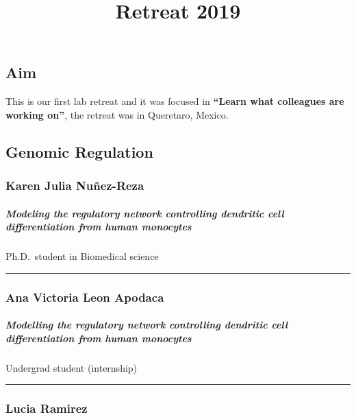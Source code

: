 \documentclass[]{article}
\title{Retreat 2019}
\author{}
\date{}
\let\oldsubparagraph\subparagraph
\renewcommand{\subparagraph}[1]{\oldsubparagraph{#1}\mbox{}}
\begin{document}
\maketitle

{
\setcounter{tocdepth}{3}
\tableofcontents
}
\subsection{Aim}\label{aim}

This is our first lab retreat and it was focused in \textbf{``Learn what
colleagues are working on''}, the retreat was in Queretaro, Mexico.\\

\subsection{Genomic Regulation}\label{genomic-regulation}

\subsubsection{Karen Julia Nuñez-Reza}\label{karen-julia-nunez-reza}

\subparagraph{ Modeling the regulatory network controlling dendritic
cell differentiation from human
monocytes}\label{modeling-the-regulatory-network-controlling-dendritic-cell-differentiation-from-human-monocytes}

Ph.D.~student in Biomedical science

\begin{center}\rule{0.5\linewidth}{\linethickness}\end{center}

\subsubsection{Ana Victoria Leon
Apodaca}\label{ana-victoria-leon-apodaca}

\subparagraph{ Modelling the regulatory network controlling dendritic
cell differentiation from human
monocytes}\label{modelling-the-regulatory-network-controlling-dendritic-cell-differentiation-from-human-monocytes}

Undergrad student (internship)

\begin{center}\rule{0.5\linewidth}{\linethickness}\end{center}

\subsubsection{Lucia Ramirez}\label{lucia-ramirez}
\end{document}
